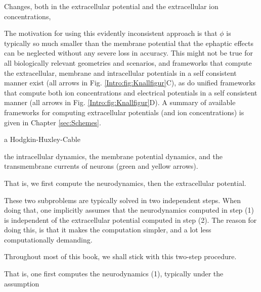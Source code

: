 Changes, both in the extracellular potential and the extracellular ion concentrations, 

The motivation for using this evidently inconsistent approach is that $\phi$ is typically so much smaller than the membrane potential that the ephaptic effects can be neglected without any severe loss in accuracy. This might not be true for all biologically relevant geometries and scenarios, and frameworks that compute the extracellular, membrane and intracellular potentials in a self consistent manner exist (all arrows in Fig. \ref{Intro:fig:Knallfigur}C), as do unified frameworks that compute both ion concentrations and electrical potentials in a self consistent manner (all arrows in Fig. \ref{Intro:fig:Knallfigur}D). A summary of available frameworks for computing extracellular potentials (and ion concentrations) is given in Chapter \ref{sec:Schemes}.



a Hodgkin-Huxley-Cable


the intracellular dynamics, the membrane potential dynamics, and the transmembrane currents of neurons (green and yellow arrows).

That is, we first compute the neurodynamics, then the extracellular potential. 


These two subproblems are typically solved in two independent steps. When doing that, one implicitly assumes that the neurodynamics computed in step (1) is independent of the extracellular potential computed in step (2). The reason for doing this, is that it makes the computation simpler, and a lot less computationally demanding. 


Throughout most of this book, we shall stick with this two-step procedure. 







That is, one first computes the neurodynamics (1), typically under the assumption 